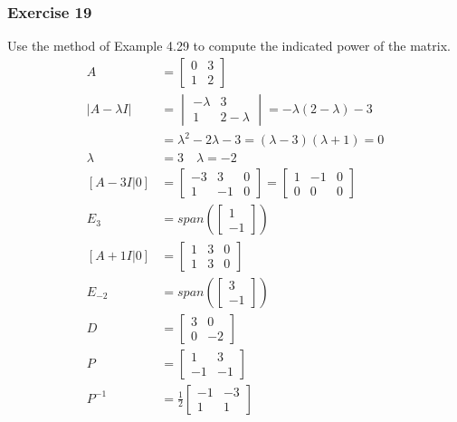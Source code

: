 \documentclass{math}
\begin{document}
\subsubsection*{Exercise 19}
Use the method of Example 4.29 to compute the indicated power of the matrix.
\begin{align*}
  A &= \begin{bmatrix}
    0 & 3 \\
    1 & 2
  \end{bmatrix} \\
  |A-\lambda I| &= \begin{vmatrix}
    -\lambda & 3 \\
    1 & 2-\lambda
  \end{vmatrix} = -\lambda(2-\lambda)-3 \\
  &= \lambda^2-2\lambda-3 = (\lambda-3)(\lambda+1) = 0 \\
  \lambda &= 3 \quad \lambda = -2 \\
  [A-3I|0] &= \begin{bmatrix}
    -3 & 3 & 0 \\
    1 & -1 & 0
  \end{bmatrix} = \begin{bmatrix}
    1 & -1 & 0 \\
    0 & 0 & 0
  \end{bmatrix} \\
  E_3 &= span\left(\begin{bmatrix}1 \\ -1\end{bmatrix}\right) \\
  [A+1I|0] &= \begin{bmatrix}
    1 & 3 & 0 \\
    1 & 3 & 0
  \end{bmatrix} \\
  E_{-2} &= span\left(\begin{bmatrix}3 \\ -1\end{bmatrix}\right) \\
  D &= \begin{bmatrix}3 & 0 \\ 0 & -2\end{bmatrix} \\
  P &= \begin{bmatrix}1 & 3 \\ -1 & -1\end{bmatrix} \\
  P^{-1} &= \frac{1}{2}\begin{bmatrix}-1 & -3 \\ 1 & 1\end{bmatrix} \\

\end{align*}
\end{document}
